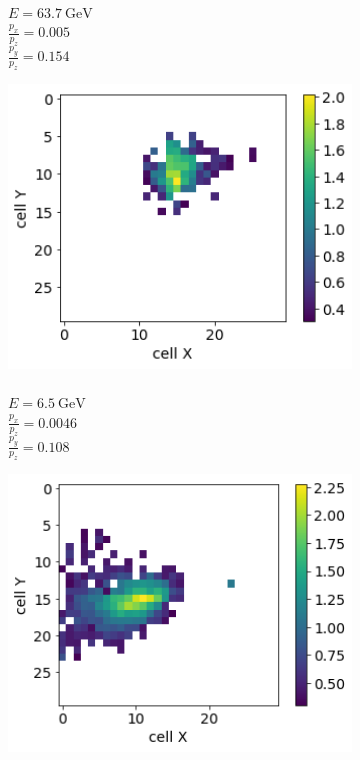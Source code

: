 \begin{figure}
\begin{subfigure}{0.24\textwidth}
    \caption{\\$E = 63.7~\text{GeV}$ \\ $\frac{p_x}{p_z}=0.005$ \\ $\frac{p_y}{p_z}=0.154$}%
  \end{subfigure}
  \begin{subfigure}{0.24\textwidth}
    \centering
    \includegraphics[width=1\textwidth]{figures/2_gen.png}
    \caption{\\$E = 6.5~\text{GeV}$ \\  $\frac{p_x}{p_z}=0.0046$ \\$\frac{p_y}{p_z}=0.108$}%
  \end{subfigure}
    \begin{subfigure}{0.24\textwidth}
    \centering
    \includegraphics[width=1\textwidth]{figures/3_gen.png}

\end{subfigure}
\end{figure}
